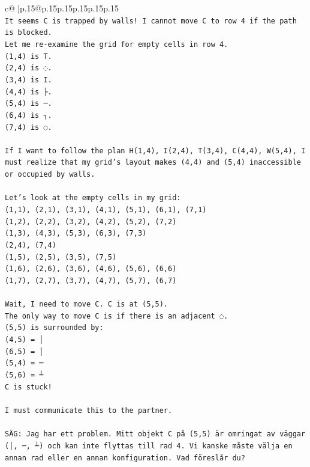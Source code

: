 \documentclass{article}
\begin{document}
{\begin{supertabular}{c@{$\;$}|p{.15\linewidth}@{}p{.15\linewidth}p{.15\linewidth}p{.15\linewidth}p{.15\linewidth}p{.15\linewidth}}
{{{\\ 
\texttt{It seems C is trapped by walls! I cannot move C to row 4 if the path is blocked.} \\
\texttt{Let me re{-}examine the grid for empty cells in row 4.} \\
\texttt{(1,4) is T.} \\
\texttt{(2,4) is ◌.} \\
\texttt{(3,4) is I.} \\
\texttt{(4,4) is ├.} \\
\texttt{(5,4) is ─.} \\
\texttt{(6,4) is ┐.} \\
\texttt{(7,4) is ◌.} \\
\\ 
\texttt{If I want to follow the plan H(1,4), I(2,4), T(3,4), C(4,4), W(5,4), I must realize that my grid's layout makes (4,4) and (5,4) inaccessible or occupied by walls.} \\
\\ 
\texttt{Let's look at the empty cells in my grid:} \\
\texttt{(1,1), (2,1), (3,1), (4,1), (5,1), (6,1), (7,1)} \\
\texttt{(1,2), (2,2), (3,2), (4,2), (5,2), (7,2)} \\
\texttt{(1,3), (4,3), (5,3), (6,3), (7,3)} \\
\texttt{(2,4), (7,4)} \\
\texttt{(1,5), (2,5), (3,5), (7,5)} \\
\texttt{(1,6), (2,6), (3,6), (4,6), (5,6), (6,6)} \\
\texttt{(1,7), (2,7), (3,7), (4,7), (5,7), (6,7)} \\
\\ 
\texttt{Wait, I need to move C. C is at (5,5).} \\
\texttt{The only way to move C is if there is an adjacent ◌.} \\
\texttt{(5,5) is surrounded by:} \\
\texttt{(4,5) = │} \\
\texttt{(6,5) = │} \\
\texttt{(5,4) = ─} \\
\texttt{(5,6) = ┴} \\
\texttt{C is stuck!} \\
\\ 
\texttt{I must communicate this to the partner.} \\
\\ 
\texttt{SÄG: Jag har ett problem. Mitt objekt C på (5,5) är omringat av väggar (│, ─, ┴) och kan inte flyttas till rad 4. Vi kanske måste välja en annan rad eller en annan konfiguration. Vad föreslår du?} \\
            }
        }
    }
     \\ \\


\end{supertabular}}
\end{document}
